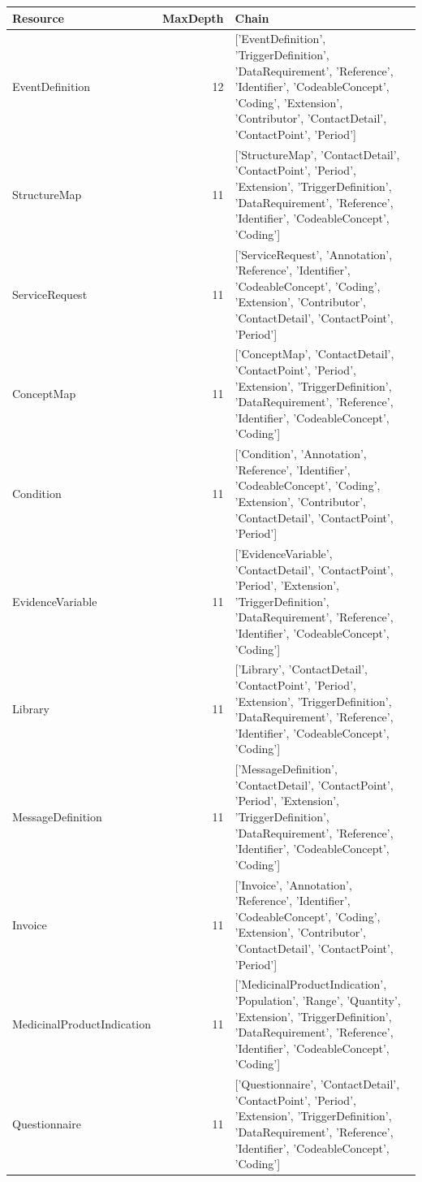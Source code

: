 \begin{tabular}{lrl}
\toprule
Resource & MaxDepth & Chain \\
\midrule
EventDefinition & 12 & ['EventDefinition', 'TriggerDefinition', 'DataRequirement', 'Reference', 'Identifier', 'CodeableConcept', 'Coding', 'Extension', 'Contributor', 'ContactDetail', 'ContactPoint', 'Period'] \\
StructureMap & 11 & ['StructureMap', 'ContactDetail', 'ContactPoint', 'Period', 'Extension', 'TriggerDefinition', 'DataRequirement', 'Reference', 'Identifier', 'CodeableConcept', 'Coding'] \\
ServiceRequest & 11 & ['ServiceRequest', 'Annotation', 'Reference', 'Identifier', 'CodeableConcept', 'Coding', 'Extension', 'Contributor', 'ContactDetail', 'ContactPoint', 'Period'] \\
ConceptMap & 11 & ['ConceptMap', 'ContactDetail', 'ContactPoint', 'Period', 'Extension', 'TriggerDefinition', 'DataRequirement', 'Reference', 'Identifier', 'CodeableConcept', 'Coding'] \\
Condition & 11 & ['Condition', 'Annotation', 'Reference', 'Identifier', 'CodeableConcept', 'Coding', 'Extension', 'Contributor', 'ContactDetail', 'ContactPoint', 'Period'] \\
EvidenceVariable & 11 & ['EvidenceVariable', 'ContactDetail', 'ContactPoint', 'Period', 'Extension', 'TriggerDefinition', 'DataRequirement', 'Reference', 'Identifier', 'CodeableConcept', 'Coding'] \\
Library & 11 & ['Library', 'ContactDetail', 'ContactPoint', 'Period', 'Extension', 'TriggerDefinition', 'DataRequirement', 'Reference', 'Identifier', 'CodeableConcept', 'Coding'] \\
MessageDefinition & 11 & ['MessageDefinition', 'ContactDetail', 'ContactPoint', 'Period', 'Extension', 'TriggerDefinition', 'DataRequirement', 'Reference', 'Identifier', 'CodeableConcept', 'Coding'] \\
Invoice & 11 & ['Invoice', 'Annotation', 'Reference', 'Identifier', 'CodeableConcept', 'Coding', 'Extension', 'Contributor', 'ContactDetail', 'ContactPoint', 'Period'] \\
MedicinalProductIndication & 11 & ['MedicinalProductIndication', 'Population', 'Range', 'Quantity', 'Extension', 'TriggerDefinition', 'DataRequirement', 'Reference', 'Identifier', 'CodeableConcept', 'Coding'] \\
Questionnaire & 11 & ['Questionnaire', 'ContactDetail', 'ContactPoint', 'Period', 'Extension', 'TriggerDefinition', 'DataRequirement', 'Reference', 'Identifier', 'CodeableConcept', 'Coding'] \\

\end{tabular}
